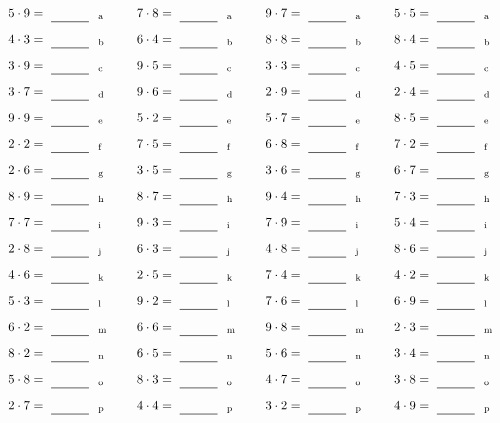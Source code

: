 \documentclass
[
  draft    = true,
  fontsize = 11pt,
  parskip  = half-
]
{scrartcl}
\begin{document}
\par\vfill\par
\begin{align*}
    \pline{5\cdot9}&=\rline{a}
  & \pline{7\cdot8}&=\rline{a}
  & \pline{9\cdot7}&=\rline{a}
  & \pline{5\cdot5}&=\rline{a} \\[1ex]
    \pline{4\cdot3}&=\rline{b}
  & \pline{6\cdot4}&=\rline{b}
  & \pline{8\cdot8}&=\rline{b}
  & \pline{8\cdot4}&=\rline{b} \\[1ex]
    \pline{3\cdot9}&=\rline{c}
  & \pline{9\cdot5}&=\rline{c}
  & \pline{3\cdot3}&=\rline{c}
  & \pline{4\cdot5}&=\rline{c} \\[1ex]
    \pline{3\cdot7}&=\rline{d}
  & \pline{9\cdot6}&=\rline{d}
  & \pline{2\cdot9}&=\rline{d}
  & \pline{2\cdot4}&=\rline{d} \\[1ex]
    \pline{9\cdot9}&=\rline{e}
  & \pline{5\cdot2}&=\rline{e}
  & \pline{5\cdot7}&=\rline{e}
  & \pline{8\cdot5}&=\rline{e} \\[1ex]
    \pline{2\cdot2}&=\rline{f}
  & \pline{7\cdot5}&=\rline{f}
  & \pline{6\cdot8}&=\rline{f}
  & \pline{7\cdot2}&=\rline{f} \\[1ex]
    \pline{2\cdot6}&=\rline{g}
  & \pline{3\cdot5}&=\rline{g}
  & \pline{3\cdot6}&=\rline{g}
  & \pline{6\cdot7}&=\rline{g} \\[1ex]
    \pline{8\cdot9}&=\rline{h}
  & \pline{8\cdot7}&=\rline{h}
  & \pline{9\cdot4}&=\rline{h}
  & \pline{7\cdot3}&=\rline{h} \\[1ex]
    \pline{7\cdot7}&=\rline{i}
  & \pline{9\cdot3}&=\rline{i}
  & \pline{7\cdot9}&=\rline{i}
  & \pline{5\cdot4}&=\rline{i} \\[1ex]
    \pline{2\cdot8}&=\rline{j}
  & \pline{6\cdot3}&=\rline{j}
  & \pline{4\cdot8}&=\rline{j}
  & \pline{8\cdot6}&=\rline{j} \\[1ex]
    \pline{4\cdot6}&=\rline{k}
  & \pline{2\cdot5}&=\rline{k}
  & \pline{7\cdot4}&=\rline{k}
  & \pline{4\cdot2}&=\rline{k} \\[1ex]
    \pline{5\cdot3}&=\rline{l}
  & \pline{9\cdot2}&=\rline{l}
  & \pline{7\cdot6}&=\rline{l}
  & \pline{6\cdot9}&=\rline{l} \\[1ex]
    \pline{6\cdot2}&=\rline{m}
  & \pline{6\cdot6}&=\rline{m}
  & \pline{9\cdot8}&=\rline{m}
  & \pline{2\cdot3}&=\rline{m} \\[1ex]
    \pline{8\cdot2}&=\rline{n}
  & \pline{6\cdot5}&=\rline{n}
  & \pline{5\cdot6}&=\rline{n}
  & \pline{3\cdot4}&=\rline{n} \\[1ex]
    \pline{5\cdot8}&=\rline{o}
  & \pline{8\cdot3}&=\rline{o}
  & \pline{4\cdot7}&=\rline{o}
  & \pline{3\cdot8}&=\rline{o} \\[1ex]
    \pline{2\cdot7}&=\rline{p}
  & \pline{4\cdot4}&=\rline{p}
  & \pline{3\cdot2}&=\rline{p}
  & \pline{4\cdot9}&=\rline{p}
\end{align*}
\end{document}
